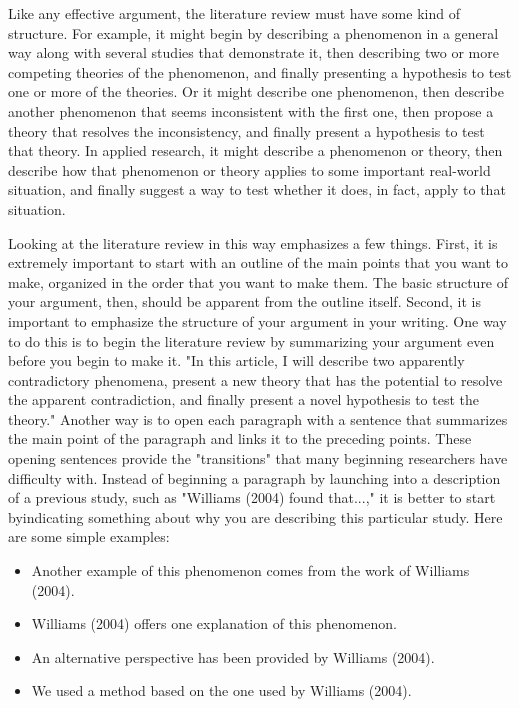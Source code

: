 Like any effective argument, the literature review must have some kind of structure. For example, it might begin by describing a phenomenon in a general way along with several studies that demonstrate it, then describing two or more competing theories of the phenomenon, and finally presenting a hypothesis to test one or more of the theories. Or it might describe one phenomenon, then describe another phenomenon that seems inconsistent with the first one, then propose a theory that resolves the inconsistency, and finally present a hypothesis to test that theory. In applied research, it might describe a phenomenon or theory, then describe how that phenomenon or theory applies to some important real-world situation, and finally suggest a way to test whether it does, in fact, apply to that situation.

Looking at the literature review in this way emphasizes a few things. First, it is extremely important to start with an outline of the main points that you want to make, organized in the order that you want to make them. The basic structure of your argument, then, should be apparent from the outline itself. Second, it is important to emphasize the structure of your argument in your writing. One way to do this is to begin the literature review by summarizing your argument even before you begin to make it. "In this article, I will describe two apparently contradictory phenomena, present a new theory that has the potential to resolve the apparent contradiction, and finally present a novel hypothesis to test the theory." Another way is to open each paragraph with a sentence that summarizes the main point of the paragraph and links it to the preceding points. These opening sentences provide the "transitions" that many beginning researchers have difficulty with. Instead of beginning a paragraph by launching into a description of a previous study, such as "Williams (2004) found that...," it is better to start byindicating something about why you are describing this particular study. Here are some simple examples:


\begin{itemize}
\item Another example of this phenomenon comes from the work of Williams (2004).

\item Williams (2004) offers one explanation of this phenomenon.

\item An alternative perspective has been provided by Williams (2004).

\item We used a method based on the one used by Williams (2004).

\end{itemize}



